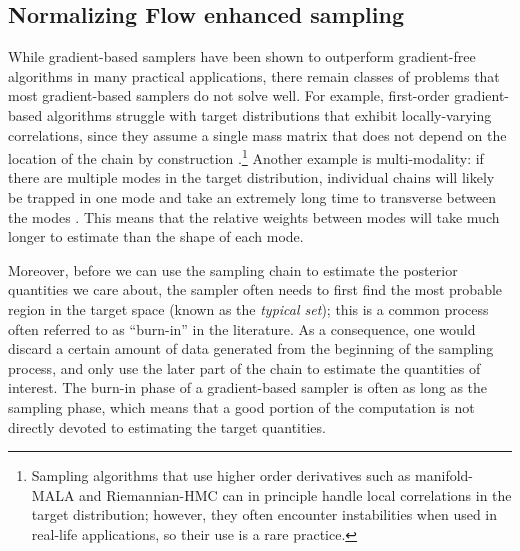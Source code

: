 \documentclass[twocolumn]{aastex631}
\begin{document}
\subsection{Normalizing Flow enhanced sampling}
\label{sec:flow}

While gradient-based samplers have been shown to outperform gradient-free
algorithms in many practical applications, there remain classes of problems
that most gradient-based samplers do not solve well. For example, first-order
gradient-based algorithms struggle with target distributions that exhibit
locally-varying correlations, since they assume a single mass matrix that does
not depend on the location of the chain by construction
\citep{2017arXiv170102434B}.\footnote{Sampling algorithms that use higher order
derivatives such as manifold-MALA and Riemannian-HMC \citep{RMHMC} can in
principle handle local correlations in the target distribution; however, they
often encounter instabilities when used in real-life applications, so their use
is a rare practice.} Another example is multi-modality: if there are multiple
modes in the target distribution, individual chains will likely be trapped in
one mode and take an extremely long time to transverse between the modes
\citep{2018arXiv180803230M}.  This means that the relative weights between modes
will take much longer to estimate than the shape of each mode.

Moreover, before we can use the sampling chain to estimate the posterior
quantities we care about, the sampler often needs to first find the most
probable region in the target space (known as the \emph{typical set}); this is
a common process often referred to as ``burn-in'' in the literature. As a
consequence, one would discard a certain amount of data generated from the
beginning of the sampling process, and only use the later part of the chain to
estimate the quantities of interest. The burn-in phase of a gradient-based
sampler is often as long as the sampling phase, which means that a good portion
of the computation is not directly devoted to estimating the target quantities.
\end{document}
